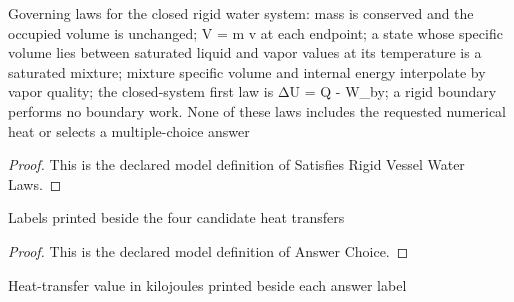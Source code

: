\begin{definition}
  \label{def:physics:phyx-mini-0451:phyxminiproblems-problemphyxmini0451-satisfiesrigidvesselwaterlaws}
  Governing laws for the closed rigid water system: mass is conserved and the occupied volume is unchanged; V = m v at each endpoint; a state whose specific volume lies between saturated liquid and vapor values at its temperature is a saturated mixture; mixture specific volume and internal energy interpolate by vapor quality; the closed-system first law is ΔU = Q - W\_by; a rigid boundary performs no boundary work. None of these laws includes the requested numerical heat or selects a multiple-choice answer
\end{definition}
\begin{proof}
  This is the declared model definition of Satisfies Rigid Vessel Water Laws.
\end{proof}
\begin{definition}
  \label{def:physics:phyx-mini-0451:phyxminiproblems-problemphyxmini0451-answerchoice}
  Labels printed beside the four candidate heat transfers
\end{definition}
\begin{proof}
  This is the declared model definition of Answer Choice.
\end{proof}
\begin{definition}
  \label{def:physics:phyx-mini-0451:phyxminiproblems-problemphyxmini0451-displayedheatinkilojoules}
  Heat-transfer value in kilojoules printed beside each answer label
\end{definition}
